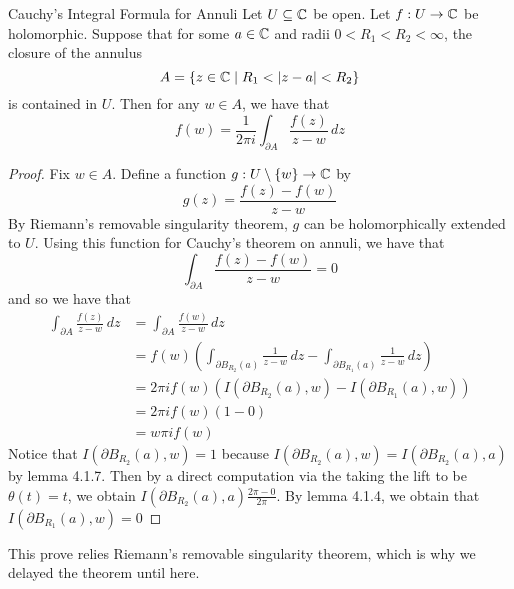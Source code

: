 \documentclass[a4paper]{article}
\begin{document}
\begin{thm}{Cauchy's Integral Formula for Annuli}{} Let $U\subseteq\mathbb{C}$ be open. Let $f:U\to\mathbb{C}$ be holomorphic. Suppose that for some $a\in\mathbb{C}$ and radii $0<R_1<R_2<\infty$, the closure of the annulus $$A=\{z\in\mathbb{C}\;|\; R_1<\abs{z-a}<R_2\}$$ is contained in $U$. Then for any $w\in A$, we have that $$f(w)=\frac{1}{2\pi i}\int_{\partial A}\frac{f(z)}{z-w}\,dz$$ \tcbline
\begin{proof}
Fix $w\in A$. Define a function $g:U\setminus\{w\}\to\mathbb{C}$ by $$g(z)=\frac{f(z)-f(w)}{z-w}$$ By Riemann's removable singularity theorem, $g$ can be holomorphically extended to $U$. Using this function for Cauchy's theorem on annuli, we have that $$\int_{\partial A}\frac{f(z)-f(w)}{z-w}=0$$ and so we have that 
\begin{align*}
\int_{\partial A}\frac{f(z)}{z-w}\,dz&=\int_{\partial A}\frac{f(w)}{z-w}\,dz\\
&=f(w)\left(\int_{\partial B_{R_2}(a)}\frac{1}{z-w}\,dz-\int_{\partial B_{R_1}(a)}\frac{1}{z-w}\,dz\right)\\
&=2\pi if(w)\left(I(\partial B_{R_2}(a),w)-I(\partial B_{R_1}(a),w)\right)\\
&=2\pi if(w)(1-0)\\
&=w\pi i f(w)
\end{align*}
Notice that $I(\partial B_{R_2}(a),w)=1$ because $I(\partial B_{R_2}(a),w)=I(\partial B_{R_2}(a),a)$ by lemma 4.1.7. Then by a direct computation via the taking the lift to be $\theta(t)=t$, we obtain $I(\partial B_{R_2}(a),a)\frac{2\pi-0}{2\pi}$. By lemma 4.1.4, we obtain that $I(\partial B_{R_1}(a),w)=0$
\end{proof}
\end{thm}

This prove relies Riemann's removable singularity theorem, which is why we delayed the theorem until here. 
\end{document}
